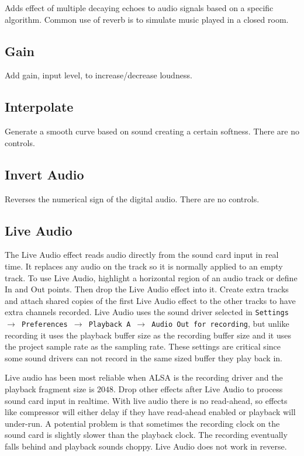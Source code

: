 Adds effect of multiple decaying echoes to audio signals based on a specific algorithm. Common use of reverb is to simulate music played in a closed room.

\subsection{Gain}%
\label{sub:gain}

Add gain, input level, to increase/decrease loudness.

\subsection{Interpolate}%
\label{sub:interpolate}

Generate a smooth curve based on sound creating a certain softness. There are no controls.

\subsection{Invert Audio}%
\label{sub:invert_audio}

Reverses the numerical sign of the digital audio. There are no controls.

\subsection{Live Audio}%
\label{sub:live_audio}

The Live Audio effect reads audio directly from the sound card input in real time. It replaces any audio on the track so it is normally applied to an empty track. To use Live Audio, highlight a horizontal region of an audio track or define In and Out points. Then drop the Live Audio effect into it. Create extra tracks and attach shared copies of the first Live Audio effect to the other tracks to have extra channels recorded. Live Audio uses the sound driver selected in \texttt{Settings $\rightarrow$ Preferences $\rightarrow$ Playback A $\rightarrow$ Audio Out for recording}, but unlike recording it uses the playback buffer size as the recording buffer size and it uses the project sample rate as the sampling rate. These settings are critical since some sound drivers can not record in the same sized buffer they play back in.

Live audio has been most reliable when ALSA is the recording driver and the playback fragment size is $2048$. Drop other effects after Live Audio to process sound card input in realtime. With live audio there is no read-ahead, so effects like compressor will either delay if they have read-ahead enabled or playback will under-run. A potential problem is that sometimes the recording clock on the sound card is slightly slower than the playback clock. The recording eventually falls behind and playback sounds choppy. Live Audio does not work in reverse.

